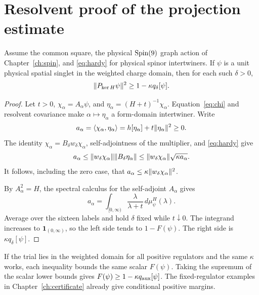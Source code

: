 \section{Resolvent proof of the projection estimate}
\begin{theorem}\label{thm:fidelity}
Assume the common square, the physical $\operatorname{Spin}(9)$ graph action of
Chapter~\ref{ch:spin}, and \eqref{eq:hardy} for physical spinor intertwiners. If $\psi$ is a unit physical spatial singlet in the weighted charge domain, then for each such $\delta>0$,
\[
 \lVert P_{\ker H}\psi\rVert^2\ge 1-\kappa q_\delta[\psi].
\]
\end{theorem}
\begin{proof}
Let $t>0$, $\chi_\alpha=A_\alpha\psi$, and
$\eta_\alpha=(H+t)^{-1}\chi_\alpha$. Equation~\eqref{eq:chi} and resolvent covariance make $\alpha\mapsto\eta_\alpha$ a form-domain intertwiner. Write
\[
 a_\alpha=\langle \chi_\alpha,\eta_\alpha\rangle
       =h[\eta_\alpha]+t\lVert \eta_\alpha\rVert^2\ge0.
\]
The identity $\chi_\alpha=B_\delta w_\delta\chi_\alpha$, self-adjointness of the multiplier, and \eqref{eq:hardy} give
\[
 a_\alpha\le\lVert w_\delta\chi_\alpha\rVert\lVert B_\delta\eta_\alpha\rVert
       \le\lVert w_\delta\chi_\alpha\rVert\sqrt{\kappa a_\alpha}.
\]
It follows, including the zero case, that
$a_\alpha\le\kappa\lVert w_\delta\chi_\alpha\rVert^{2}$.

By $A_\alpha^2=H$, the spectral calculus for the self-adjoint $A_\alpha$ gives
\[
 a_\alpha=\int_{[0,\infty)}\frac{\lambda}{\lambda+t}\,d\mu_\psi^H(\lambda).
\]
Average over the sixteen labels and hold $\delta$ fixed while $t\downarrow0$. The integrand increases to $\mathbf1_{(0,\infty)}$, so the left side tends to $1-F(\psi)$. The right side is $\kappa q_\delta[\psi]$.
\end{proof}

If the trial lies in the weighted domain for all positive regulators and the same $\kappa$ works, each inequality bounds the same scalar $F(\psi)$. Taking the supremum of the scalar lower bounds gives $F(\psi)\ge 1-\kappa q_{\rm aux}[\psi]$. The fixed-regulator examples in Chapter~\ref{ch:certificate} already give conditional positive margins.
